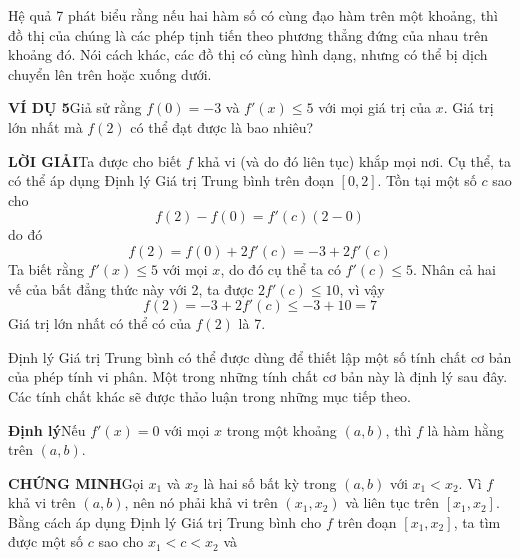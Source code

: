 \noindent
\begin{minipage}[t]{0.25\textwidth}
  \vspace*{423pt}
  \fontsize{8.8}{12}\selectfont
  Hệ quả 7 phát biểu rằng nếu hai hàm số có cùng đạo hàm trên một khoảng, thì đồ thị của chúng là các phép tịnh tiến theo phương thẳng đứng của nhau trên khoảng đó. Nói cách khác, các đồ thị có cùng hình dạng, nhưng có thể bị dịch chuyển lên trên hoặc xuống dưới.
\end{minipage}%
\hfill
\begin{minipage}[t]{0.71\textwidth}
  \fontsize{9.5}{13.5}\selectfont

  \textbf{\textsf{\color{stewartcyan}VÍ DỤ 5}}\quad Giả sử rằng $f(0) = -3$ và $f'(x) \leqslant 5$ với mọi giá trị của $x$. Giá trị lớn nhất mà $f(2)$ có thể đạt được là bao nhiêu?

  \vspace{2pt}
  \textbf{\textsf{\color{stewartcyan}LỜI GIẢI}}\quad Ta được cho biết $f$ khả vi (và do đó liên tục) khắp mọi nơi. Cụ thể, ta có thể áp dụng Định lý Giá trị Trung bình trên đoạn $[0, 2]$. Tồn tại một số $c$ sao cho
  \[
    f(2) - f(0) = f'(c)(2 - 0)
  \]
  do đó
  \[
    f(2) = f(0) + 2f'(c) = -3 + 2f'(c)
  \]
  Ta biết rằng $f'(x) \leqslant 5$ với mọi $x$, do đó cụ thể ta có $f'(c) \leqslant 5$. Nhân cả hai vế của bất đẳng thức này với 2, ta được $2f'(c) \leqslant 10$, vì vậy
  \[
    f(2) = -3 + 2f'(c) \leqslant -3 + 10 = 7
  \]
  Giá trị lớn nhất có thể có của $f(2)$ là 7. \hfill {\color{stewartcyan}\blacksquare}

  \vspace{6pt}
  Định lý Giá trị Trung bình có thể được dùng để thiết lập một số tính chất cơ bản của phép tính vi phân. Một trong những tính chất cơ bản này là định lý sau đây. Các tính chất khác sẽ được thảo luận trong những mục tiếp theo.

  \vspace{4pt}
  \begin{stewarttheorembox}
    \hspace{0.6em}\textbf{\textsf{\color{stewartred}Định lý}}\hspace{0.8em}Nếu $f'(x) = 0$ với mọi $x$ trong một khoảng $(a, b)$, thì $f$ là hàm hằng trên $(a, b)$.
  \end{stewarttheorembox}

  \vspace{3pt}
  \textbf{\textsf{\color{stewartred}CHỨNG MINH}}\quad Gọi $x_1$ và $x_2$ là hai số bất kỳ trong $(a, b)$ với $x_1 < x_2$. Vì $f$ khả vi trên $(a, b)$, nên nó phải khả vi trên $(x_1, x_2)$ và liên tục trên $[x_1, x_2]$. Bằng cách áp dụng Định lý Giá trị Trung bình cho $f$ trên đoạn $[x_1, x_2]$, ta tìm được một số $c$ sao cho $x_1 < c < x_2$ và
  

\end{minipage}
